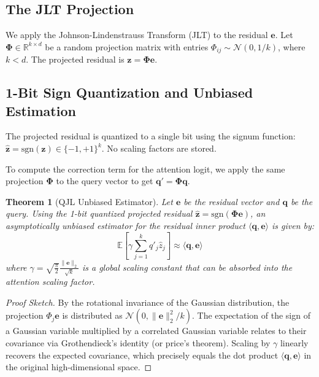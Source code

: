 \documentclass[11pt]{article}
\newtheorem{theorem}{Theorem}
\begin{document}
\subsection{The JLT Projection}
We apply the Johnson-Lindenstrauss Transform (JLT) to the residual $\mathbf{e}$. Let $\mathbf{\Phi} \in \mathbb{R}^{k \times d}$ be a random projection matrix with entries $\Phi_{ij} \sim \mathcal{N}(0, 1/k)$, where $k < d$. The projected residual is $\mathbf{z} = \mathbf{\Phi}\mathbf{e}$.

\subsection{1-Bit Sign Quantization and Unbiased Estimation}
The projected residual is quantized to a single bit using the signum function: $\hat{\mathbf{z}} = \text{sgn}(\mathbf{z}) \in \{-1, +1\}^k$. No scaling factors are stored.

To compute the correction term for the attention logit, we apply the same projection $\mathbf{\Phi}$ to the query vector to get $\mathbf{q}' = \mathbf{\Phi}\mathbf{q}$. 

\begin{theorem}[QJL Unbiased Estimator]
Let $\mathbf{e}$ be the residual vector and $\mathbf{q}$ be the query. Using the 1-bit quantized projected residual $\hat{\mathbf{z}} = \text{sgn}(\mathbf{\Phi}\mathbf{e})$, an asymptotically unbiased estimator for the residual inner product $\langle \mathbf{q}, \mathbf{e} \rangle$ is given by:
\begin{equation}
\mathbb{E} \left[ \gamma \sum_{j=1}^k q'_j \hat{z}_j \right] \approx \langle \mathbf{q}, \mathbf{e} \rangle
\end{equation}
where $\gamma = \sqrt{\frac{\pi}{2}} \frac{\|\mathbf{e}\|_2}{\sqrt{k}}$ is a global scaling constant that can be absorbed into the attention scaling factor.
\end{theorem}

\begin{proof}[Proof Sketch]
By the rotational invariance of the Gaussian distribution, the projection $\Phi_{j} \mathbf{e}$ is distributed as $\mathcal{N}(0, \|\mathbf{e}\|_2^2/k)$. The expectation of the sign of a Gaussian variable multiplied by a correlated Gaussian variable relates to their covariance via Grothendieck's identity (or price's theorem). Scaling by $\gamma$ linearly recovers the expected covariance, which precisely equals the dot product $\langle \mathbf{q}, \mathbf{e} \rangle$ in the original high-dimensional space.
\end{proof}
\end{document}
